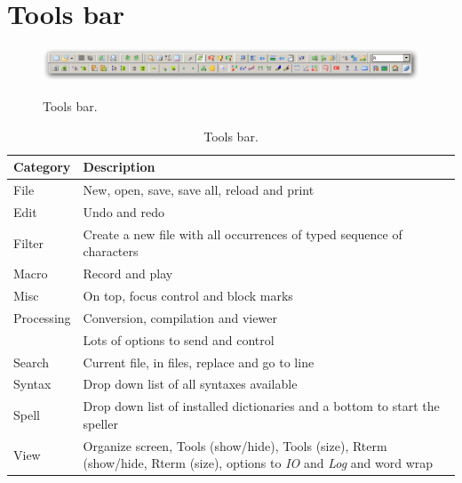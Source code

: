 
\hypertarget{working_toolsbar}{}
\section{Tools bar}

\begin{figure}[h!]
  \includegraphics[scale=0.35]{./res/toolsbar.png}\\
  \caption{Tools bar.}
  \label{fig:toolsbar}
\end{figure}

\begin{table}[h!]
  \begin{footnotesize}
    \begin{tabularx}{\textwidth}{>{\hsize=0.3\hsize}X>{\hsize=0.7\hsize}X}\\
      \hline
      \textbf{Category} & \textbf{Description} \\
      \hline
      File & New, open, save, save all, reload and print \\
      Edit & Undo and redo \\
      Filter & Create a new file with all occurrences of typed sequence of characters \\
      Macro & Record and play \\
      Misc & On top, focus control and block marks \\
      Processing & Conversion, compilation and viewer \\
      \RR{} & Lots of options to send and control \RR{} \\
      Search & Current file, in files, replace and go to line \\
      Syntax & Drop down list of all syntaxes available \\
      Spell & Drop down list of installed dictionaries and a bottom to start the speller \\
      View & Organize screen, Tools (show/hide), Tools (size), Rterm (show/hide, Rterm (size), options to \textit{IO} and \textit{Log} and word wrap \\
      \hline
    \end{tabularx}
  \end{footnotesize}
  \caption{Tools bar.}
  \label{tab:toolsbar}
\end{table}

